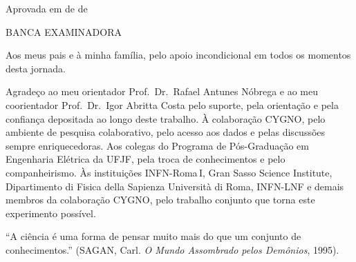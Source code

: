 \documentclass[
       oneside,
       english,
       brazil
       ]{abntbibufjf}
\begin{document}

\inserecapa

\inserefolhaderosto

\inserecatalog

\begin{folhadeaprovacao}
\inicfolhaaprov

Aprovada em \underline{\hspace{1cm}} de \underline{\hspace{2.5cm}} de \underline{\hspace{1.2cm}}

\vfill
\begin{center} BANCA EXAMINADORA \end{center}

\end{folhadeaprovacao}
\cleardoublepage


\begin{dedicatoria}
Aos meus pais e à minha família, pelo apoio incondicional em todos os momentos desta jornada.
\end{dedicatoria}


\begin{agradecimentos}
Agradeço ao meu orientador Prof.\ Dr.\ Rafael Antunes Nóbrega e ao meu
coorientador Prof.\ Dr.\ Igor Abritta Costa pelo suporte, pela orientação e
pela confiança depositada ao longo deste trabalho. À colaboração CYGNO, pelo
ambiente de pesquisa colaborativo, pelo acesso aos dados e pelas discussões
sempre enriquecedoras. Aos colegas do Programa de Pós-Graduação em Engenharia
Elétrica da UFJF, pela troca de conhecimentos e pelo companheirismo. Às
instituições INFN-Roma\,I, Gran Sasso Science Institute, Dipartimento di Fisica
della Sapienza Università di Roma, INFN-LNF e demais membros da colaboração
CYGNO, pelo trabalho conjunto que torna este experimento possível.
\end{agradecimentos}


\begin{epigrafemenos}
``A ciência é uma forma de pensar muito mais do que um conjunto de
conhecimentos.'' (SAGAN, Carl. \textit{O Mundo Assombrado pelos Demônios},
1995).
\end{epigrafemenos}
\end{document}
